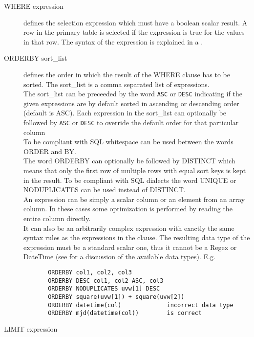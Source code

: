 \begin{description}
  \item[WHERE expression]
       defines the selection expression which must have a boolean
       scalar result. A row in the primary table
       is selected if the expression is true for the values in that row.
       The syntax of the expression is explained
       in a .
  \item[ \label{TAQL:ORDERBY}ORDERBY sort\_list]
       defines the order in which the result of the WHERE clause
       has to be sorted. The sort\_list is a comma separated list of
       expressions.
       \\The sort\_list can be preceeded by the word \texttt{ASC} or
       \texttt{DESC} indicating if the given expressions are by
       default sorted in ascending or descending order (default is ASC).
       Each expression in the sort\_list can optionally be
       followed by \texttt{ASC} or \texttt{DESC} to override the
       default order for that particular column
       \\To be compliant with SQL whitespace can be used between the
       words ORDER and BY.
       \\The word ORDERBY can optionally be followed by DISTINCT
       which means that only the first row of multiple rows with
       equal sort keys is kept in the result. To be compliant with
       SQL dialects the word UNIQUE or NODUPLICATES can be used
       instead of DISTINCT.
       \\An expression can be simply a scalar column or an element from
       an array column. In these cases some optimization is performed
       by reading the entire column directly.
       \\It can also be an arbitrarily complex expression
       with exactly the same syntax rules as the expressions in the
        clause.
       The resulting data type of the expression must
       be a standard scalar one, thus it cannot be a Regex or
       DateTime (see  for a discussion
       of the available data types).
       E.g.
       \begin{verbatim}
       ORDERBY col1, col2, col3
       ORDERBY DESC col1, col2 ASC, col3
       ORDERBY NODUPLICATES uvw[1] DESC
       ORDERBY square(uvw[1]) + square(uvw[2])
       ORDERBY datetime(col)             incorrect data type
       ORDERBY mjd(datetime(col))        is correct
       \end{verbatim}
  \item[ LIMIT expression]

\end{description}
